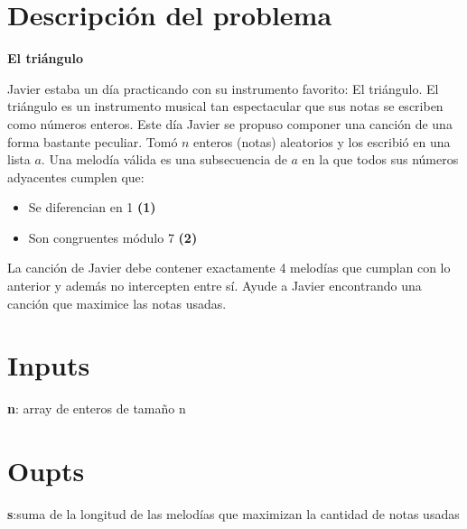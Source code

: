 \documentclass[sn-mathphys,Numbered]{sn-jnl}%
\theoremstyle{thmstyleone}%
\theoremstyle{thmstyletwo}%
\theoremstyle{thmstylethree}%
\begin{document}


\maketitle

\section{Descripci\'on del problema}\label{sec1}

\begin{center}
    \textbf{El triángulo}
\end{center} 

Javier estaba un día practicando con su instrumento favorito: El triángulo. El triángulo es un instrumento musical tan espectacular que sus notas se escriben como números enteros. Este día Javier se propuso componer una canción de una forma bastante peculiar. Tomó $n$ enteros (notas) aleatorios y los escribió en una lista $a$. Una melodía válida es una subsecuencia de $a$
en la que todos sus números adyacentes cumplen que:

\begin{itemize}
    \item Se diferencian en 1 \textbf{(1)} 
    \item Son congruentes m\'odulo 7 \textbf{(2)}  
\end{itemize}
La canción de Javier debe contener exactamente 4 melodías que cumplan con lo anterior y además no intercepten entre sí. Ayude a Javier encontrando una canción que maximice las notas usadas.

\section*{Inputs}
\textbf{n}: array de enteros de tama\~no n 
\section*{Oupts}
\textbf{s}:suma de la longitud de las melod\'ias que maximizan la cantidad de notas usadas 
\end{document}
